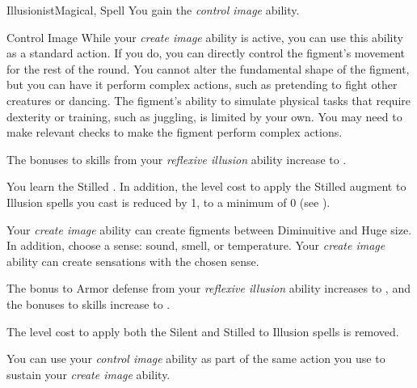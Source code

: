 \begin{feat}{Illusionist}{Magical, Spell}
         You gain the \textit{control image} ability.
        \begin{ability}{Control Image}{}
            While your \textit{create image} ability is active, you can use this ability as a standard action.
            If you do, you can directly control the figment's movement for the rest of the round.
            You cannot alter the fundamental shape of the figment, but you can have it perform complex actions, such as pretending to fight other creatures or dancing.
            The figment's ability to simulate physical tasks that require dexterity or training, such as juggling, is limited by your own.
            You may need to make relevant checks to make the figment perform complex actions.
        \end{ability}

         The bonuses to skills from your \textit{reflexive illusion} ability increase to .

         You learn the Stilled .
        In addition, the level cost to apply the Stilled augment to Illusion spells you cast is reduced by 1, to a minimum of 0 (see ).

         Your \textit{create image} ability can create figments between Diminuitive and Huge size.
        In addition, choose a sense: sound, smell, or temperature.
        Your \textit{create image} ability can create sensations with the chosen sense.

         The bonus to Armor defense from your \textit{reflexive illusion} ability increases to , and the bonuses to skills increase to .

         The level cost to apply both the Silent and Stilled  to Illusion spells is removed.

         You can use your \textit{control image} ability as part of the same action you use to sustain your \textit{create image} ability. 
    \end{feat}


